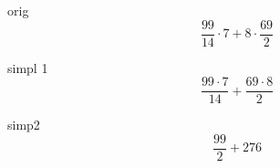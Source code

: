 \documentclass[a4paper, 12pt]{article}
\begin{document}
                          
orig \[ {{ \frac {99} {14} \cdot 7} + {8 \cdot  \frac {69} {2}}} \]

simpl 1 \[ { \frac {{99 \cdot 7}} {14} +  \frac {{69 \cdot 8}} {2}} \]

simp2 \[ { \frac {99} {2} + 276} \]
\end{document}
